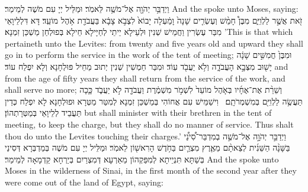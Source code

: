 {וַיְדַבֵּ֥ר יְהֹוָ֖ה אֶל־מֹשֶׁ֥ה לֵּאמֹֽר׃}
{וּמַלֵּיל יְיָ עִם מֹשֶׁה לְמֵימַר׃}
{And the \lord\space spoke unto Moses, saying:}{}
{זֹ֖את אֲשֶׁ֣ר לַלְוִיִּ֑ם מִבֶּן֩ חָמֵ֨שׁ וְעֶשְׂרִ֤ים שָׁנָה֙ וָמַ֔עְלָה יָבוֹא֙ לִצְבֹ֣א צָבָ֔א בַּעֲבֹדַ֖ת אֹ֥הֶל מוֹעֵֽד׃
}
{דָּא דִּלְלֵיוָאֵי מִבַּר עֶשְׂרִין וַחֲמֵישׁ שְׁנִין וּלְעֵילָא יֵיתֵי לְחַיָּילָא חֵילָא בְּפוּלְחַן מַשְׁכַּן זִמְנָא׃}
{’This is that which pertaineth unto the Levites: from twenty and five years old and upward they shall go in to perform the service in the work of the tent of meeting;}{}
{וּמִבֶּן֙ חֲמִשִּׁ֣ים שָׁנָ֔ה יָשׁ֖וּב מִצְּבָ֣א הָעֲבֹדָ֑ה וְלֹ֥א יַעֲבֹ֖ד עֽוֹד׃
}
{וּמִבַּר חַמְשִׁין שְׁנִין יְתוּב מֵחֵיל פּוּלְחָנָא וְלָא יִפְלַח עוֹד׃}
{and from the age of fifty years they shall return from the service of the work, and shall serve no more;}{}
{וְשֵׁרֵ֨ת אֶת־אֶחָ֜יו בְּאֹ֤הֶל מוֹעֵד֙ לִשְׁמֹ֣ר מִשְׁמֶ֔רֶת וַעֲבֹדָ֖ה לֹ֣א יַעֲבֹ֑ד כָּ֛כָה תַּעֲשֶׂ֥ה לַלְוִיִּ֖ם בְּמִשְׁמְרֹתָֽם׃ \petucha 
{}}
{וִישַׁמֵּישׁ עִם אֲחוֹהִי בְּמַשְׁכַּן זִמְנָא לְמִטַּר מַטְּרָא וּפוּלְחָנָא לָא יִפְלַח כְּדֵין תַּעֲבֵיד לְלֵיוָאֵי בְּמַטְּרָתְהוֹן׃}
{but shall minister with their brethren in the tent of meeting, to keep the charge, but they shall do no manner of service. Thus shalt thou do unto the Levites touching their charges.’}{}
\newperek
{}%
{וַיְדַבֵּ֣ר יְהֹוָ֣ה אֶל־מֹשֶׁ֣ה בְמִדְבַּר־סִ֠ינַ֠י בַּשָּׁנָ֨ה הַשֵּׁנִ֜ית לְצֵאתָ֨ם מֵאֶ֧רֶץ מִצְרַ֛יִם בַּחֹ֥דֶשׁ הָרִאשׁ֖וֹן לֵאמֹֽר׃
}
{וּמַלֵּיל יְיָ עִם מֹשֶׁה בְּמַדְבְּרָא דְּסִינַי בְּשַׁתָּא תִּנְיֵיתָא לְמִפַּקְהוֹן מֵאַרְעָא דְּמִצְרַיִם בְּיַרְחָא קַדְמָאָה לְמֵימַר׃}
{And the \lord\space spoke unto Moses in the wilderness of Sinai, in the first month of the second year after they were come out of the land of Egypt, saying:}{}

